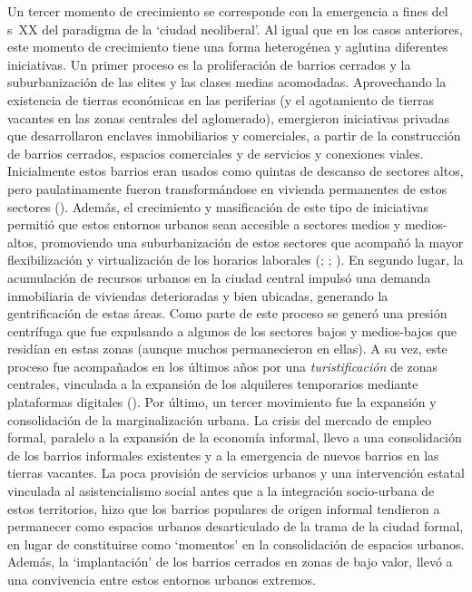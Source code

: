 \documentclass[
  spanish,
  a4paper,%
  chapterprefix=true,%
  DIV=calc,%
  twoside]{scrbook}%
\begin{document}
Un tercer momento de crecimiento se corresponde con la emergencia a
fines del s~XX del paradigma de la `ciudad neoliberal'. Al igual que en
los casos anteriores, este momento de crecimiento tiene una forma
heterogénea y aglutina diferentes iniciativas. Un primer proceso es la
proliferación de barrios cerrados y la suburbanización de las elites y
las clases medias acomodadas. Aprovechando la existencia de tierras
económicas en las periferias (y el agotamiento de tierras vacantes en
las zonas centrales del aglomerado), emergieron iniciativas privadas que
desarrollaron enclaves inmobiliarios y comerciales, a partir de la
construcción de barrios cerrados, espacios comerciales y de servicios y
conexiones viales. Inicialmente estos barrios eran usados como quintas
de descanso de sectores altos, pero paulatinamente fueron
transformándose en vivienda permanentes de estos sectores
(). Además, el crecimiento y masificación de este tipo de
iniciativas permitió que estos entornos urbanos sean accesible a
sectores medios y medios-altos, promoviendo una suburbanización de estos
sectores que acompañó la mayor flexibilización y virtualización de los
horarios laborales (; ; ). En
segundo lugar, la acumulación de recursos urbanos en la ciudad central
impulsó una demanda inmobiliaria de viviendas deterioradas y bien
ubicadas, generando la gentrificación de estas áreas. Como parte de este
proceso se generó una presión centrífuga que fue expulsando a algunos de
los sectores bajos y medios-bajos que residían en estas zonas (aunque
muchos permanecieron en ellas). A su vez, este proceso fue acompañados
en los últimos años por una \emph{turistificación} de zonas centrales,
vinculada a la expansión de los alquileres temporarios mediante
plataformas digitales (). Por último, un tercer
movimiento fue la expansión y consolidación de la marginalización
urbana. La crisis del mercado de empleo formal, paralelo a la expansión
de la economía informal, llevo a una consolidación de los barrios
informales existentes y a la emergencia de nuevos barrios en las tierras
vacantes. La poca provisión de servicios urbanos y una intervención
estatal vinculada al asistencialismo social antes que a la integración
socio-urbana de estos territorios, hizo que los barrios populares de
origen informal tendieron a permanecer como espacios urbanos
desarticulado de la trama de la ciudad formal, en lugar de constituirse
como `momentos' en la consolidación de espacios urbanos. Además, la
`implantación' de los barrios cerrados en zonas de bajo valor, llevó a
una convivencia entre estos entornos urbanos extremos.
\end{document}
